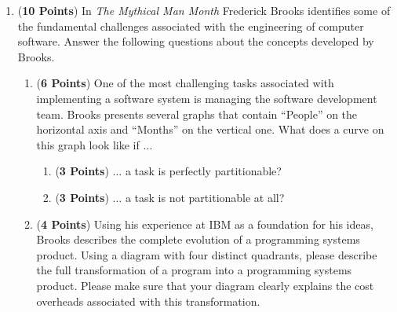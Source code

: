 \documentclass[12pt,epsf,psfig,graphics]{article}
\begin{document}
\begin{enumerate}
\item ({\bf 10 Points}) In {\em The Mythical Man Month} Frederick Brooks identifies some of the fundamental challenges
  associated with the engineering of computer software.  Answer the following questions about the concepts developed by
  Brooks.

  \begin{enumerate}
          
  \item ({\bf 6 Points}) One of the most challenging tasks associated
    with implementing a software system is managing the software
    development team.  Brooks presents several graphs that contain
    ``People'' on the horizontal axis and ``Months'' on the vertical
    one.  What does a curve on this graph look like if $\ldots$

    \begin{enumerate}

      \item ({\bf 3 Points}) $\ldots$ a task is perfectly partitionable?
    
      \item ({\bf 3 Points}) $\ldots$ a task is not partitionable at all?

    \end{enumerate}

  \item ({\bf 4 Points}) Using his experience at IBM as a foundation
    for his ideas, Brooks describes the complete evolution of a
    programming systems product.  Using a diagram with four distinct
    quadrants, please describe the full transformation of a program
    into a programming systems product.  Please make sure that your
    diagram clearly explains the cost overheads associated with this
    transformation.

  \end{enumerate}
 

\end{enumerate}
\end{document}
